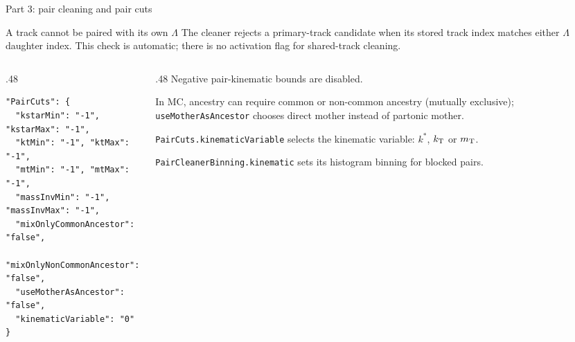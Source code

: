 \begin{frame}[fragile]{Part 3: pair cleaning and pair cuts}
 \begin{block}{A track cannot be paired with its own $\Lambda$}
 The cleaner rejects a primary-track candidate when its stored track index matches either $\Lambda$ daughter index. This check is automatic; there is no activation flag for shared-track cleaning.
 \end{block}
 \begin{columns}[T]
 \begin{column}{.48\textwidth}
 \begin{lstlisting}
"PairCuts": {
  "kstarMin": "-1", "kstarMax": "-1",
  "ktMin": "-1", "ktMax": "-1",
  "mtMin": "-1", "mtMax": "-1",
  "massInvMin": "-1", "massInvMax": "-1",
  "mixOnlyCommonAncestor": "false",
  "mixOnlyNonCommonAncestor": "false",
  "useMotherAsAncestor": "false",
  "kinematicVariable": "0"
}
 \end{lstlisting}
 \end{column}
 \begin{column}{.48\textwidth}
 \small Negative pair-kinematic bounds are disabled.\par\medskip
 In MC, ancestry can require common or non-common ancestry (mutually exclusive); \texttt{useMotherAsAncestor} chooses direct mother instead of partonic mother.\par\medskip
 \texttt{PairCuts.kinematicVariable} selects the kinematic variable: $k^*$, $k_{\rm T}$ or $m_{\rm T}$.\par\smallskip
 \texttt{PairCleanerBinning.kinematic} sets its histogram binning for blocked pairs.
 \end{column}
 \end{columns}
\end{frame}

